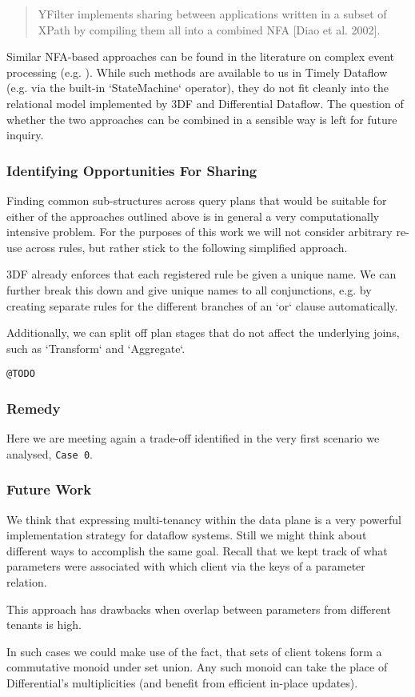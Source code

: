 \documentclass[../catalog.tex]{subfiles}
\begin{document}
\begin{quote}
YFilter implements sharing between applications written in a subset of
XPath by compiling them all into a combined NFA [Diao et al. 2002].
\end{quote}

Similar NFA-based approaches can be found in the literature on complex
event processing (e.g. \cite{agrawal2008}). While such methods are
available to us in Timely Dataflow (e.g. via the built-in
`StateMachine` operator), they do not fit cleanly into the relational
model implemented by 3DF and Differential Dataflow. The question of
whether the two approaches can be combined in a sensible way is left
for future inquiry.

\subsubsection{Identifying Opportunities For Sharing}

Finding common sub-structures across query plans that would be
suitable for either of the approaches outlined above is in general a
very computationally intensive problem. For the purposes of this work
we will not consider arbitrary re-use across rules, but rather stick
to the following simplified approach.

3DF already enforces that each registered rule be given a unique
name. We can further break this down and give unique names to all
conjunctions, e.g. by creating separate rules for the different
branches of an `or` clause automatically.

Additionally, we can split off plan stages that do not affect the
underlying joins, such as `Transform` and `Aggregate`.

\texttt{@TODO}

\subsubsection{Remedy}

Here we are meeting again a trade-off identified in the very first
scenario we analysed, \texttt{Case 0}.

\subsubsection{Future Work}

We think that expressing multi-tenancy within the data plane is a very
powerful implementation strategy for dataflow systems. Still we might
think about different ways to accomplish the same goal. Recall that we
kept track of what parameters were associated with which client via
the keys of a parameter relation.

This approach has drawbacks when overlap between parameters from
different tenants is high.

In such cases we could make use of the fact, that sets of client
tokens form a commutative monoid under set union. Any such monoid can
take the place of Differential's multiplicities (and benefit from
efficient in-place updates).
\end{document}
